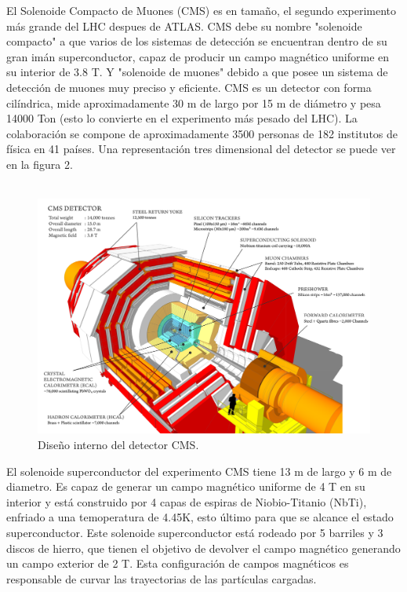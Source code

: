El Solenoide Compacto de Muones (CMS) es en tamaño, el segundo experimento más grande del LHC despues de ATLAS. CMS debe su nombre "solenoide compacto" a que varios de los sistemas de detección se encuentran dentro de su gran imán superconductor, capaz de producir un campo magnético uniforme en su interior de 3.8 T. Y "solenoide de muones" debido a que posee un sistema de detección de muones muy preciso y eficiente. CMS es un detector con forma cilíndrica, mide aproximadamente 30 m de largo por 15 m de diámetro y pesa 14000 Ton (esto lo convierte en el experimento más pesado del LHC). La colaboración se compone de aproximadamente 3500 personas de 182 institutos de física en 41 países. Una representación tres dimensional del detector se puede ver en la figura 2.
\\
\\
\begin{figure}
\centering
\includegraphics[width=15cm]{F2.png}
\caption{\label{fig:frog} Diseño interno del detector CMS.}
\end{figure}


El solenoide superconductor del experimento CMS tiene 13 m de largo y 6 m de diametro. Es capaz de generar un campo magnético uniforme de 4 T en su interior y está construido por 4 capas de espiras de Niobio-Titanio (NbTi), enfriado a una temoperatura de 4.45K, esto último para que se alcance el estado superconductor. Este solenoide superconductor está rodeado por 5 barriles y 3 discos de hierro, que tienen el objetivo de devolver el campo magnético generando un campo exterior de 2 T.  Esta configuración de campos magnéticos es responsable de curvar las trayectorias de las partículas cargadas.
\\
\\

